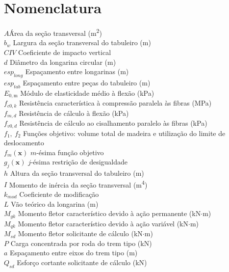 \section*{Nomenclatura}

\begin{tabbing}
$A$\qquad\qquad \= Área da seção transversal (m\textsuperscript{2})\\
$b_w$ \> Largura da seção transversal do tabuleiro (m)\\
$CIV$ \> Coeficiente de impacto vertical\\
$d$ \> Diâmetro da longarina circular (m)\\
$esp_{long}$ \> Espaçamento entre longarinas (m)\\
$esp_{tab}$ \> Espaçamento entre peças do tabuleiro (m)\\
$E_{0,\mathrm{m}}$ \> Módulo de elasticidade médio à flexão (kPa)\\
$f_{c0,k}$ \> Resistência característica à compressão paralela às fibras (MPa)\\
$f_{m,d}$ \> Resistência de cálculo à flexão (kPa)\\
$f_{v0,d}$ \> Resistência de cálculo ao cisalhamento paralelo às fibras (kPa)\\
$f_1,\ f_2$ \> Funções objetivo: volume total de madeira e utilização do limite de deslocamento\\
$f_m(\mathbf{x})$ \> $m$-ésima função objetivo\\
$g_j(\mathbf{x})$ \> $j$-ésima restrição de desigualdade\\
$h$ \> Altura da seção transversal do tabuleiro (m)\\
$I$ \> Momento de inércia da seção transversal (m\textsuperscript{4})\\
$k_{mod}$ \> Coeficiente de modificação\\
$L$ \> Vão teórico da longarina (m)\\
$M_{gk}$ \> Momento fletor característico devido à ação permanente (kN$\cdot$m)\\
$M_{qk}$ \> Momento fletor característico devido à ação variável (kN$\cdot$m)\\
$M_{sd}$ \> Momento fletor solicitante de cálculo (kN$\cdot$m)\\
$P$ \> Carga concentrada por roda do trem tipo (kN)\\
$a$ \> Espaçamento entre eixos do trem tipo (m)\\
$Q_{sd}$ \> Esforço cortante solicitante de cálculo (kN)\\

\end{tabbing}
